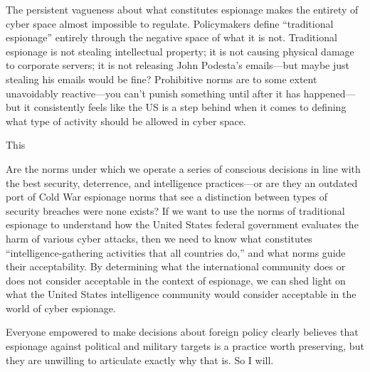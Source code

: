 \documentclass{memoir}
\begin{document}
\begin{refsegment}
The persistent vagueness about what constitutes espionage makes the entirety of cyber space almost impossible to regulate. Policymakers define ``traditional espionage'' entirely through the negative space of what it is not. Traditional espionage is not stealing intellectual property; it is not causing physical damage to corporate servers; it is not releasing John Podesta's emails---but maybe just stealing his emails would be fine? Prohibitive norms are to some extent unavoidably reactive---you can't punish something until after it has happened---but it consistently feels like the US is a step behind when it comes to defining what type of activity should be allowed in cyber space.

This








Are the norms under which we operate a series of conscious decisions in line with the best security, deterrence, and intelligence practices---or are they an outdated port of Cold War espionage norms that see a distinction between types of security breaches were none exists? If we want to use the norms of traditional espionage to understand how the United States federal government evaluates the harm of various cyber attacks, then we need to know what constitutes ``intelligence-gathering activities that all countries do,'' and what norms guide their acceptability. By determining what the international community does or does not consider acceptable in the context of espionage, we can shed light on what the United States intelligence community would consider acceptable in the world of cyber espionage.

Everyone empowered to make decisions about foreign policy clearly believes that espionage against political and military targets is a practice worth preserving, but they are unwilling to articulate exactly why that is. So I will.


\end{refsegment}
\end{document}
